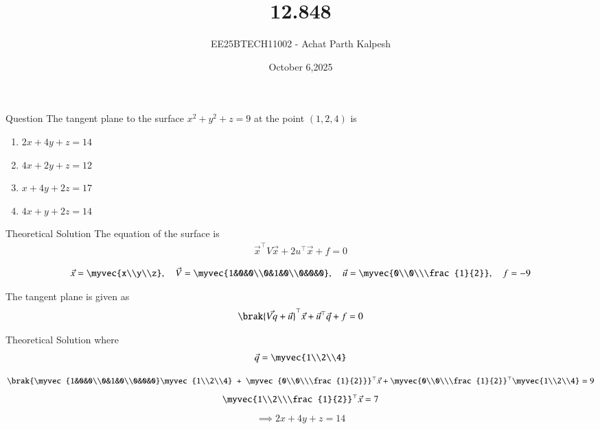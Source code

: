 \documentclass{beamer}
\title %
{12.848}
\date{October 6,2025}
\author %
{EE25BTECH11002 - Achat Parth Kalpesh}
\begin{document}
\frame{\titlepage}

\begin{frame}{Question}
The tangent plane to the surface $x^2 + y^2 + z = 9$ at the point $(1, 2, 4)$ is
\begin{enumerate}
        \item $2x+4y+z=14$
        \item $4x+2y+z=12$
        \item $x+4y+2z=17$
        \item $4x+y+2z=14$
\end{enumerate}
\end{frame}

\begin{frame}{Theoretical Solution}
The equation of the surface is\\
\begin{align}
\vec{x}^\top V \vec{x} + 2u^\top \vec{x} + f = 0
\end{align}

\begin{align}
\vec{x} = \myvec{x\\y\\z}, \quad 
\vec{V} = \myvec{1&0&0\\0&1&0\\0&0&0}, \quad
\vec{u} = \myvec{0\\0\\\frac{1}{2}}, \quad
f = -9
\end{align}

The tangent plane is given as
\begin{align}
    \brak{\vec{Vq} + \vec{u}}^\top \vec{x} + \vec{u}^\top \vec{q} + f = 0
\end{align}
\end{frame}

\begin{frame}{Theoretical Solution}
where
\begin{align}
    \vec{q} = \myvec{1\\2\\4}
\end{align}

\begin{align}
    \brak{\myvec{1&0&0\\0&1&0\\0&0&0}\myvec{1\\2\\4} + \myvec{0\\0\\\frac{1}{2}}}^\top \vec{x} +
    \myvec{0\\0\\\frac{1}{2}}^\top \myvec{1\\2\\4} = 9
\end{align}
\begin{align}
    \myvec{1\\2\\\frac{1}{2}}^\top \vec{x} = 7
\end{align}
\begin{align}
    \implies 2x + 4y + z = 14
\end{align}
\end{frame}
\end{document}
